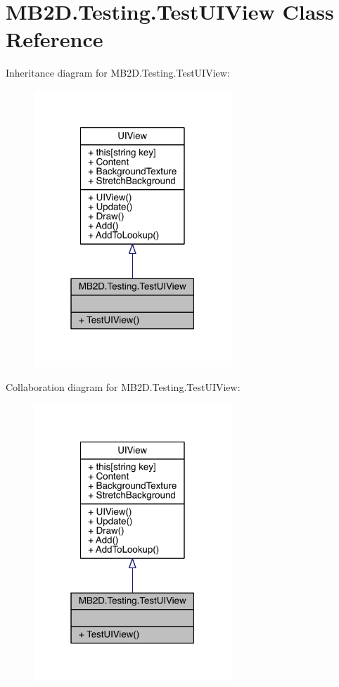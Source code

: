 \hypertarget{class_m_b2_d_1_1_testing_1_1_test_u_i_view}{}\section{M\+B2\+D.\+Testing.\+Test\+U\+I\+View Class Reference}
\label{class_m_b2_d_1_1_testing_1_1_test_u_i_view}


Inheritance diagram for M\+B2\+D.\+Testing.\+Test\+U\+I\+View\+:\nopagebreak
\begin{figure}[H]
\begin{center}
\leavevmode
\includegraphics[width=211pt]{class_m_b2_d_1_1_testing_1_1_test_u_i_view__inherit__graph}
\end{center}
\end{figure}


Collaboration diagram for M\+B2\+D.\+Testing.\+Test\+U\+I\+View\+:\nopagebreak
\begin{figure}[H]
\begin{center}
\leavevmode
\includegraphics[width=211pt]{class_m_b2_d_1_1_testing_1_1_test_u_i_view__coll__graph}
\end{center}
\end{figure}
